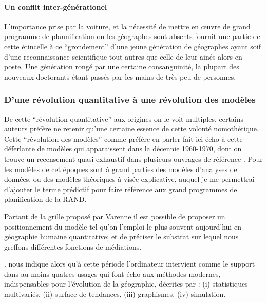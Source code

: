 \paragraph{Un conflit inter-générationel}

L'importance prise par la voiture, et la nécessité de mettre en œuvre de grand programme de plannification ou les géographes sont absents fournit une partie de cette étincelle à ce \enquote{grondement} d'une jeune génération de géographes ayant soif d'une reconnaissance scientifique tout autres que celle de leur ainés \autocite{Harvey1969} alors en poste. Une génération rongé par une certaine consanguinité, la plupart des nouveaux doctorants étant passés par les mains de très peu de personnes. \autocite[49-50]{Glick1988}

\subsubsection{D'une révolution quantitative à une révolution des modèles}

De cette \enquote{révolution quantitative} aux origines on le voit multiples, certains auteurs préfère ne retenir qu'une certaine essence de cette volonté nomothétique. Cette \enquote{révolution des modèles} comme préfère en parler \textcite{Wilson1970} \autocite{Varenne2014} fait ici écho à cette déferlante de modèles qui apparaissent dans la décennie 1960-1970, dont on trouve un recensement quasi exhaustif dans plusieurs ouvrages de référence \autocite{Haggett1965,Chorley1967}. Pour \autocite{Varenne2014} les modèles de cet époques sont à grand parties des modèles d'analyses de données, ou des modèles théoriques à visée explicative, auquel je me permettrai d'ajouter le terme prédictif pour faire référence aux grand programmes de planification de la RAND.

Partant de la grille proposé par Varenne \autocite{Varenne2013} il est possible de proposer un positionnement du modèle tel qu'on l'emploi le plus souvent aujourd'hui en géographie humaine quantitative; et de préciser le substrat sur lequel nous greffons différentes fonctions de médiations.

\autocite{Gould1970}. \textcite{Haggett1969} nous indique alors qu'à cette période l'ordinateur intervient comme le support dans au moins quatres usages qui font écho aux méthodes modernes, indispensables pour l'évolution  de la géographie, décrites par \textcite{Claval1977} : (i) statistiques multivariés, (ii) surface de tendances, (iii) graphismes, (iv) simulation. 

